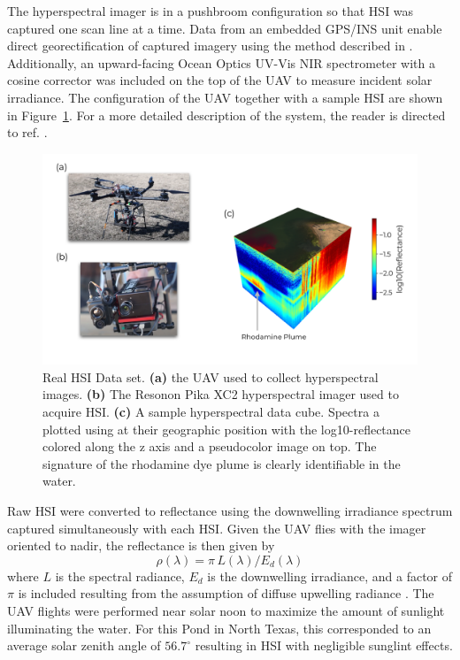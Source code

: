 \documentclass[remotesensing,article,submit,pdftex,moreauthors]{Definitions/mdpi}
\begin{document}
The hyperspectral imager is in a pushbroom configuration so that HSI was captured one scan line at a time. Data from an embedded GPS/INS unit enable direct georectification of captured imagery using the method described in \cite{muller2002program}. Additionally, an upward-facing Ocean Optics UV-Vis NIR spectrometer with a cosine corrector was included on the top of the UAV to measure incident solar irradiance. The configuration of the UAV together with a sample HSI are shown in Figure~\ref{fig:robotteam-data}. For a more detailed description of the system, the reader is directed to ref. \cite{robot-team-1, robot-team-2}.

\begin{figure}[t]
\includegraphics[width=\columnwidth]{methods/robot-team/robot-team-overview.pdf}
\caption{Real HSI Data set. \textbf{(a)} the UAV used to collect hyperspectral images. \textbf{(b)} The Resonon Pika XC2 hyperspectral imager used to acquire HSI. \textbf{(c)} A sample hyperspectral data cube. Spectra a plotted using at their geographic position with the log10-reflectance colored along the z axis and a pseudocolor image on top. The signature of the rhodamine dye plume is clearly identifiable in the water. \label{fig:robotteam-data}}
\end{figure}  

Raw HSI were converted to reflectance using the downwelling irradiance spectrum captured simultaneously with each HSI. Given the UAV flies with the imager oriented to nadir, the reflectance is then given by 
\begin{equation}
    \rho(\lambda) = \pi\,L(\lambda)/E_d(\lambda)
\end{equation}
where $L$ is the spectral radiance, $E_d$ is the downwelling irradiance, and a factor of $\pi$ is included resulting from the assumption of diffuse upwelling radiance \cite{ruddick2019review}. The UAV flights were performed near solar noon to maximize the amount of sunlight illuminating the water. For this Pond in North Texas, this corresponded to an average solar zenith angle of $56.7^{\circ}$ resulting in HSI with negligible sunglint effects.
\end{document}
